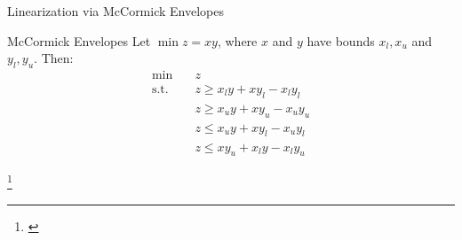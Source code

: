 \documentclass[aspectratio=169,xcolor=dvipsnames]{beamer}
\begin{document}
\begin{frame}{Linearization via McCormick Envelopes}
\begin{minipage}[t]{0.48\textwidth}
    \end{minipage}
    \hfill
    \begin{minipage}[t]{0.48\textwidth}
        \begin{block}{McCormick Envelopes}
            Let $\min z = xy$, where $x$ and $y$ have bounds $x_l, x_u$ and $y_l, y_u$. Then:
            \begin{align*}
                \min \quad & z \\
                \text{s.t.} \quad
                & z \geq x_l y + x y_l - x_l y_l \\
                & z \geq x_u y + x y_u - x_u y_u \\
                & z \leq x_u y + x y_l - x_u y_l \\
                & z \leq x y_u + x_l y - x_l y_u
            \end{align*}
        \end{block}
    \end{minipage}
    \footnote{\cite{mccormick1976computability}}
\end{frame}
    
    
\end{document}
